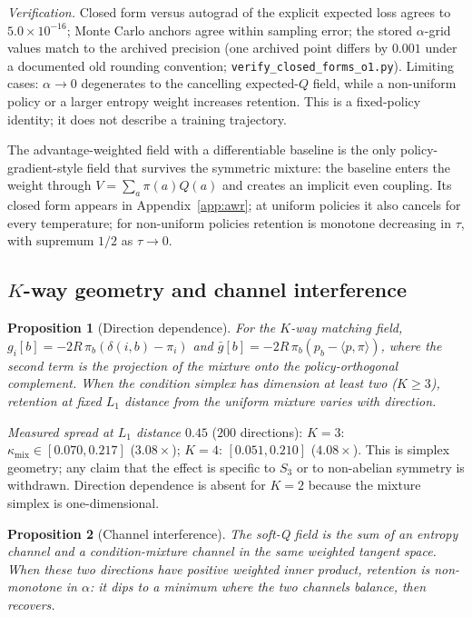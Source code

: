 \documentclass{article}
\newtheorem{proposition}{Proposition}
\newcommand{\kmix}{\kappa_{\mathrm{mix}}}
\newcommand{\gbar}{\bar{g}}
\begin{document}
\noindent\emph{Verification.} Closed form versus autograd of the explicit
expected loss agrees to $5.0\times10^{-16}$; Monte Carlo anchors agree within
sampling error; the stored $\alpha$-grid values match to the archived
precision (one archived point differs by $0.001$ under a documented old
rounding convention; \texttt{verify\_closed\_forms\_o1.py}). Limiting cases:
$\alpha\to0$ degenerates to the cancelling expected-$Q$ field, while a
non-uniform policy or a larger entropy weight increases retention. This is a
fixed-policy identity; it does not describe a training trajectory.

The advantage-weighted field with a differentiable baseline is the only
policy-gradient-style field that survives the symmetric mixture: the baseline
enters the weight through $V=\sum_a \pi(a)Q(a)$ and creates an implicit even
coupling. Its closed form appears in Appendix~\ref{app:awr}; at uniform
policies it also cancels for every temperature; for non-uniform policies
retention is monotone decreasing in $\tau$, with supremum $1/2$ as
$\tau\to0$.

\subsection{$K$-way geometry and channel interference}
\label{sec:theory-kway}

\begin{proposition}[Direction dependence]
\label{prop:direction}
For the $K$-way matching field,
$g_i[b]=-2R\,\pi_b(\delta(i,b)-\pi_i)$ and
$\gbar[b]=-2R\,\pi_b(p_b-\langle p,\pi\rangle)$, where the second term is the
projection of the mixture onto the policy-orthogonal complement. When the
condition simplex has dimension at least two ($K\ge3$), retention at fixed
$L_1$ distance from the uniform mixture varies with direction.
\end{proposition}

\noindent\emph{Measured spread at $L_1$ distance $0.45$} ($200$ directions):
$K=3$: $\kmix\in[0.070,0.217]$ ($3.08\times$); $K=4$: $[0.051,0.210]$
($4.08\times$). This is simplex geometry; any claim that the effect is
specific to $S_3$ or to non-abelian symmetry is withdrawn. Direction
dependence is absent for $K=2$ because the mixture simplex is
one-dimensional.

\begin{proposition}[Channel interference]
\label{prop:interference}
The soft-Q field is the sum of an entropy channel and a condition-mixture
channel in the same weighted tangent space. When these two directions have
positive weighted inner product, retention is non-monotone in $\alpha$: it
dips to a minimum where the two channels balance, then recovers.
\end{proposition}
\end{document}
